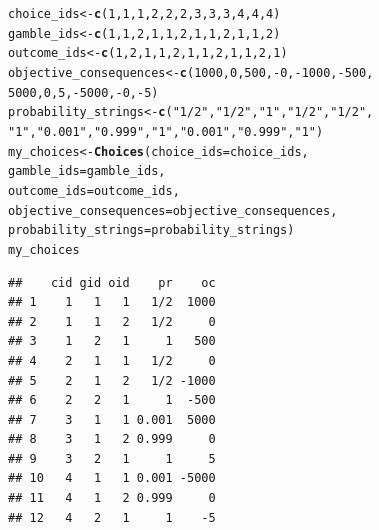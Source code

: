 \documentclass{article}\usepackage[]{graphicx}\usepackage[]{color}
\makeatletter
\newcommand{\hlnum}[1]{\textcolor[rgb]{0.686,0.059,0.569}{#1}}%
\newcommand{\hlstr}[1]{\textcolor[rgb]{0.192,0.494,0.8}{#1}}%
\newcommand{\hlopt}[1]{\textcolor[rgb]{0,0,0}{#1}}%
\newcommand{\hlstd}[1]{\textcolor[rgb]{0.345,0.345,0.345}{#1}}%
\newcommand{\hlkwb}[1]{\textcolor[rgb]{0.69,0.353,0.396}{#1}}%
\newcommand{\hlkwc}[1]{\textcolor[rgb]{0.333,0.667,0.333}{#1}}%
\newcommand{\hlkwd}[1]{\textcolor[rgb]{0.737,0.353,0.396}{\textbf{#1}}}%
\newenvironment{kframe}{%
 \def\at@end@of@kframe{}%
 \ifinner\ifhmode%
  \def\at@end@of@kframe{\end{minipage}}%
  \begin{minipage}{\columnwidth}%
 \fi\fi%
 \def\FrameCommand##1{\hskip\@totalleftmargin \hskip-\fboxsep
 \colorbox{shadecolor}{##1}\hskip-\fboxsep
     \hskip-\linewidth \hskip-\@totalleftmargin \hskip\columnwidth}%
 \MakeFramed {\advance\hsize-\width
   \@totalleftmargin\z@ \linewidth\hsize
   \@setminipage}}%
 {\par\unskip\endMakeFramed%
 \at@end@of@kframe}
\newenvironment{knitrout}{}{} %
\makeatother
\begin{document}
\begin{knitrout}
\color{fgcolor}\begin{kframe}
\begin{alltt}
\hlstd{choice_ids} \hlkwb{<-} \hlkwd{c}\hlstd{(}\hlnum{1}\hlstd{,} \hlnum{1}\hlstd{,} \hlnum{1}\hlstd{,} \hlnum{2}\hlstd{,} \hlnum{2}\hlstd{,} \hlnum{2}\hlstd{,} \hlnum{3}\hlstd{,} \hlnum{3}\hlstd{,} \hlnum{3}\hlstd{,} \hlnum{4}\hlstd{,} \hlnum{4}\hlstd{,} \hlnum{4}\hlstd{)}
\hlstd{gamble_ids} \hlkwb{<-} \hlkwd{c}\hlstd{(}\hlnum{1}\hlstd{,} \hlnum{1}\hlstd{,} \hlnum{2}\hlstd{,} \hlnum{1}\hlstd{,} \hlnum{1}\hlstd{,} \hlnum{2}\hlstd{,} \hlnum{1}\hlstd{,} \hlnum{1}\hlstd{,} \hlnum{2}\hlstd{,} \hlnum{1}\hlstd{,} \hlnum{1}\hlstd{,} \hlnum{2}\hlstd{)}
\hlstd{outcome_ids} \hlkwb{<-} \hlkwd{c}\hlstd{(}\hlnum{1}\hlstd{,} \hlnum{2}\hlstd{,} \hlnum{1}\hlstd{,} \hlnum{1}\hlstd{,} \hlnum{2}\hlstd{,} \hlnum{1}\hlstd{,} \hlnum{1}\hlstd{,} \hlnum{2}\hlstd{,} \hlnum{1}\hlstd{,} \hlnum{1}\hlstd{,} \hlnum{2}\hlstd{,} \hlnum{1}\hlstd{)}
\hlstd{objective_consequences} \hlkwb{<-} \hlkwd{c}\hlstd{(}\hlnum{1000}\hlstd{,} \hlnum{0}\hlstd{,} \hlnum{500}\hlstd{,} \hlopt{-}\hlnum{0}\hlstd{,} \hlopt{-}\hlnum{1000}\hlstd{,} \hlopt{-}\hlnum{500}\hlstd{,}
        \hlnum{5000}\hlstd{,} \hlnum{0}\hlstd{,} \hlnum{5}\hlstd{,} \hlopt{-}\hlnum{5000}\hlstd{,} \hlopt{-}\hlnum{0}\hlstd{,} \hlopt{-}\hlnum{5}\hlstd{)}
\hlstd{probability_strings} \hlkwb{<-} \hlkwd{c}\hlstd{(}\hlstr{"1/2"}\hlstd{,} \hlstr{"1/2"}\hlstd{,} \hlstr{"1"}\hlstd{,} \hlstr{"1/2"}\hlstd{,} \hlstr{"1/2"}\hlstd{,}
        \hlstr{"1"}\hlstd{,} \hlstr{"0.001"}\hlstd{,} \hlstr{"0.999"}\hlstd{,} \hlstr{"1"}\hlstd{,} \hlstr{"0.001"}\hlstd{,} \hlstr{"0.999"}\hlstd{,} \hlstr{"1"}\hlstd{)}
\hlstd{my_choices} \hlkwb{<-} \hlkwd{Choices}\hlstd{(}\hlkwc{choice_ids}\hlstd{=choice_ids,}
        \hlkwc{gamble_ids}\hlstd{=gamble_ids,}
        \hlkwc{outcome_ids}\hlstd{=outcome_ids,}
        \hlkwc{objective_consequences}\hlstd{=objective_consequences,}
        \hlkwc{probability_strings}\hlstd{=probability_strings)}
\hlstd{my_choices}
\end{alltt}
\begin{verbatim}
##    cid gid oid    pr    oc
## 1    1   1   1   1/2  1000
## 2    1   1   2   1/2     0
## 3    1   2   1     1   500
## 4    2   1   1   1/2     0
## 5    2   1   2   1/2 -1000
## 6    2   2   1     1  -500
## 7    3   1   1 0.001  5000
## 8    3   1   2 0.999     0
## 9    3   2   1     1     5
## 10   4   1   1 0.001 -5000
## 11   4   1   2 0.999     0
## 12   4   2   1     1    -5

\end{verbatim}
\end{kframe}
\end{knitrout}
\end{document}
